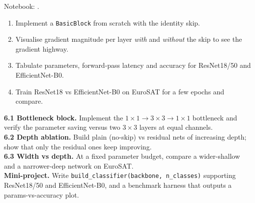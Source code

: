 \begin{practbox}
Notebook: .
\begin{enumerate}[leftmargin=1.4em,nosep]
  \item Implement a \texttt{BasicBlock} from scratch with the identity skip.
  \item Visualise gradient magnitude per layer \emph{with} and \emph{without} the
  skip to see the gradient highway.
  \item Tabulate parameters, forward-pass latency and accuracy for ResNet18/50 and
  EfficientNet-B0.
  \item Train ResNet18 vs EfficientNet-B0 on EuroSAT for a few epochs and compare.
\end{enumerate}
\end{practbox}

\begin{exbox}
\textbf{6.1 Bottleneck block.} Implement the $1\times1\to3\times3\to1\times1$
bottleneck and verify the parameter saving versus two $3\times3$ layers at equal
channels.\\[2pt]
\textbf{6.2 Depth ablation.} Build plain (no-skip) vs residual nets of increasing
depth; show that only the residual ones keep improving.\\[2pt]
\textbf{6.3 Width vs depth.} At a fixed parameter budget, compare a wider-shallow
and a narrower-deep network on EuroSAT.\\[2pt]
\textbf{Mini-project.} Write \texttt{build\_classifier(backbone, n\_classes)}
supporting ResNet18/50 and EfficientNet-B0, and a benchmark harness that outputs
a params-vs-accuracy plot.
\end{exbox}
